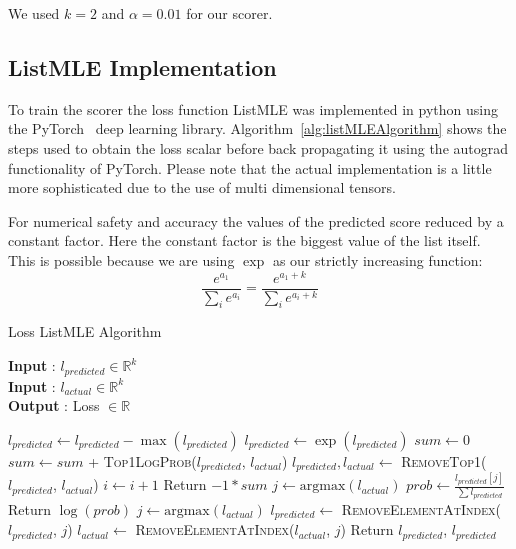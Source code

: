 \documentclass[12pt, twoside, ngerman]{report}
\begin{document}
We used $k=2$ and $\alpha=0.01$ for our scorer.

\subsection{ListMLE Implementation}

To train the scorer the loss function ListMLE was implemented in python using the PyTorch~\cite{PyTorch} deep learning library.
Algorithm~\ref{alg:listMLEAlgorithm} shows the steps used to obtain the loss scalar before back propagating it using the autograd functionality of PyTorch.
Please note that the actual implementation is a little more sophisticated due to the use of multi dimensional tensors.

For numerical safety and accuracy the values of the predicted score reduced by a constant factor.  Here the constant factor is the biggest value of the list itself.
This is possible because we are using $\exp$ as our strictly increasing function:
$$
\frac{e^{a_1}}{\sum\limits_{i} e^{a_i}} = \frac{e^{a_1 + k}}{\sum\limits_{i} e^{a_i + k}} 
$$

\begin{algorithm}[h]
\caption{Loss ListMLE Algorithm}
\label{alg:listMLEAlgorithm}
\hspace*{\algorithmicindent} \textbf{Input} : $l_{predicted} \in \mathbb{R}^k$ \\
\hspace*{\algorithmicindent} \textbf{Input} : $l_{actual} \in \mathbb{R}^k$ \\
\hspace*{\algorithmicindent} \textbf{Output} : Loss $\in \mathbb{R}$
\begin{algorithmic}[1]
    \State $l_{predicted} \gets l_{predicted} - \max(l_{predicted})$
    \State $l_{predicted} \gets \exp(l_{predicted})$
    \State $sum \gets 0$
     
        \State $sum \gets sum$ + \textsc{Top1LogProb}($l_{predicted}$,  $l_{actual}$)
        \State $l_{predicted},  l_{actual} \gets $ \textsc{RemoveTop1}($l_{predicted}$,  $l_{actual}$)
        \State $i \gets i + 1$
    \EndFor
    \State  Return $-1 * sum$
    \EndProcedure
    \State $j \gets \textrm{argmax}(l_{actual})$
    \State $prob \gets \frac{l_{predicted}[j]}{\sum l_{predicted} }$
    \State  Return $\log(prob)$
    \EndProcedure
    \State $j \gets \textrm{argmax}(l_{actual})$
    \State $l_{predicted} \gets$ \textsc{RemoveElementAtIndex}($l_{predicted}$, $j$)
    \State $l_{actual} \gets$ \textsc{RemoveElementAtIndex}($l_{actual}$, $j$)
    \State  Return $l_{predicted}$,  $l_{predicted}$
    \EndProcedure
\end{algorithmic}
\end{algorithm}
\end{document}

